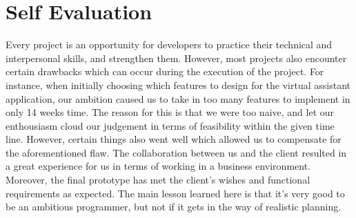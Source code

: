 \section{Self Evaluation} %
\label{sec:self_evaluation}

Every project is an opportunity for developers to practice their technical and interpersonal skills, and strengthen them. However, most projects also encounter certain drawbacks which can occur during the execution of the project. For instance, when initially choosing which features to design for the virtual assistant application, our ambition caused us to take in too many features to implement in only 14 weeks time. The reason for this is that we were too naive, and let our enthousiasm cloud our judgement in terms of feasibility within the given time line. However, certain things also went well which allowed us to compensate for the aforementioned flaw. The collaboration between us and the client resulted in a great experience for us in terms of working in a business environment. Moreover, the final prototype has met the client's wishes and functional requirements as expected. The main lesson learned here is that it's very good to be an ambitious programmer, but not if it gets in the way of realistic planning. 